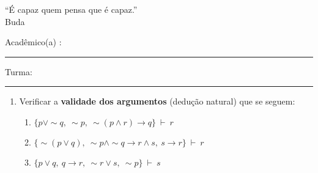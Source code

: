 \documentclass[12pt, a4paper,final]{article}
\begin{document}

\begin{center}
\end{center}

\begin{flushright}
``É capaz quem pensa que é capaz.''\\{\footnotesize  Buda}
\end{flushright}


\vskip 0.5cm Acad\^emico(a) : \rule{10cm}{0.4pt} Turma:  \rule{1cm}{0.4pt}
\noindent

\begin{enumerate}

\itemsep 1cm

\item Verificar a \textbf{validade dos argumentos} (dedu\c c\~ao natural) que se seguem: %

\begin{enumerate}

\item $\{ p \vee \sim q,~ \sim p,~ \sim (p \wedge r) \rightarrow q \} ~\vdash~ r$

\item $\{ \sim (p \vee q),~ \sim p \wedge \sim q \rightarrow r \wedge s,~ s \rightarrow r \} ~\vdash~ r$

\item $\{ p \vee q,~ q \rightarrow r,~ \sim r \vee s,~ \sim p \} ~\vdash~ s$








\end{enumerate}
\end{enumerate}
\end{document}
